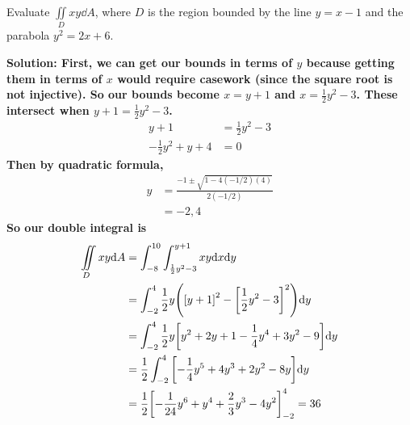 \begin{example}
    Evaluate \( \iint\limits_Dxy\dd A \), where \( D \) is the region bounded by the line \( y=x-1 \) and the parabola \( y^2=2x+6 \). \par \bf{Solution: }
    First, we can get our bounds in terms of \( y \) because getting them in terms of \( x \) would require casework (since the square root is not injective). So our bounds become \( x=y+1 \) and \( x=\frac{1}{2}y^2-3 \). These intersect when \( y+1=\frac{1}{2}y^2-3 \).
    \begin{align*}
        y+1 &= \frac{1}{2}y^2-3 \\
        -\frac{1}{2}y^2+y+4 &= 0
    \end{align*}
    Then by quadratic formula,
    \begin{align*}
        y &= \frac{-1\pm\sqrt{1-4(-1/2)(4)}}{2(-1/2)} \\
        &= -2, 4
    \end{align*}
    So our double integral is
    \begin{align*}
        \iint\limits_Dxy\dd A &= \int_{-8}^{10}\int_{\frac{1}{2}y^2-3}^{y+1}xy\dd x\dd y \\
        &= \int_{-2}^{4}\frac{1}{2}y\pqty{\bqty{y+1}^2-\bqty{\frac{1}{2}y^2-3}^2}\dd y \\
        &= \int_{-2}^4\frac{1}{2}y\bqty{y^2+2y+1-\frac{1}{4}y^4+3y^2-9}\dd y \\
        &= \frac{1}{2}\int_{-2}^4\bqty{-\frac{1}{4}y^5+4y^3+2y^2-8y}\dd y \\
        &= \frac{1}{2}\bqty{-\frac{1}{24}y^6+y^4+\frac{2}{3}y^3-4y^2}_{-2}^4 = 36
    \end{align*}
\end{example}
